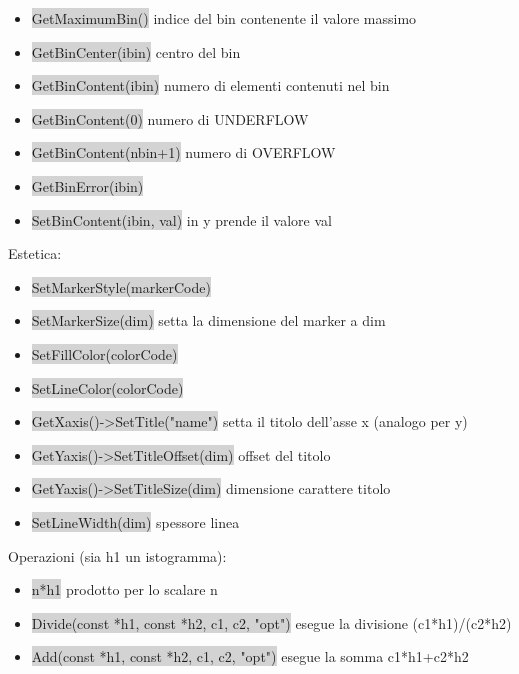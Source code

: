 \documentclass[a4paper]{article}
\begin{document}
    \begin{itemize}
        \item \colorbox{LightGray}{GetMaximumBin()} indice del bin contenente il valore massimo
        \item \colorbox{LightGray}{GetBinCenter(ibin)} centro del bin
        \item \colorbox{LightGray}{GetBinContent(ibin)} numero di elementi contenuti nel bin
        \item \colorbox{LightGray}{GetBinContent(0)} numero di UNDERFLOW
        \item \colorbox{LightGray}{GetBinContent(nbin+1)} numero di OVERFLOW
        \item \colorbox{LightGray}{GetBinError(ibin)}
        \item \colorbox{LightGray}{SetBinContent(ibin, val)} in y prende il valore val
    \end{itemize}
    Estetica:
    \begin{itemize}
        \item \colorbox{LightGray}{SetMarkerStyle(markerCode)}
        \item \colorbox{LightGray}{SetMarkerSize(dim)} setta la dimensione del marker a dim
        \item \colorbox{LightGray}{SetFillColor(colorCode)}
        \item \colorbox{LightGray}{SetLineColor(colorCode)}
        \item \colorbox{LightGray}{GetXaxis()->SetTitle("name")} setta il titolo dell'asse x (analogo per y)
        \item \colorbox{LightGray}{GetYaxis()->SetTitleOffset(dim)} offset del titolo
        \item \colorbox{LightGray}{GetYaxis()->SetTitleSize(dim)} dimensione carattere titolo
        \item \colorbox{LightGray}{SetLineWidth(dim)} spessore linea
    \end{itemize}
    Operazioni (sia h1 un istogramma):
    \begin{itemize}
        \item \colorbox{LightGray}{n*h1} prodotto per lo scalare n
        \item \colorbox{LightGray}{Divide(const *h1, const *h2, c1, c2, "opt")} esegue la divisione (c1*h1)/(c2*h2)
        \item \colorbox{LightGray}{Add(const *h1, const *h2, c1, c2, "opt")} esegue la somma c1*h1+c2*h2
    \end{itemize}
\end{document}
